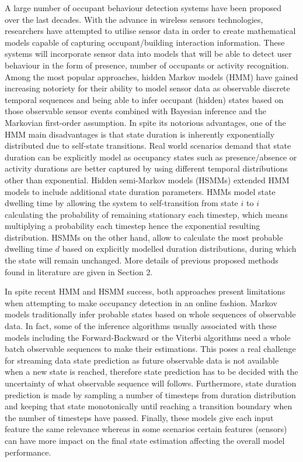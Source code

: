 \documentclass[conference]{IEEEtran}
\begin{document}
A large number of occupant behaviour detection systems have been proposed over the last decades\cite{Page2008}\cite{Pavel2006}\cite{Cook2013}. With the advance in wireless sensors technologies, researchers have attempted to utilise sensor data in order to create mathematical models capable of capturing occupant/building interaction information\cite{Teixeira2011}. These systems will incorporate sensor data into models that will be able to detect user behaviour in the form of presence, number of occupants or activity recognition. Among the most popular approaches, hidden Markov models (HMM) have gained increasing notoriety for their ability to model sensor data as observable discrete temporal sequences and being able to infer occupant (hidden) states based on those observable sensor events combined with Bayesian inference and the Markovian first-order assumption. In spite its notorious advantages, one of the HMM main disadvantages is that state duration is inherently exponentially distributed due to self-state transitions. Real world scenarios demand that state duration can be explicitly model as occupancy states such as presence/absence or activity durations are better captured by using different temporal distributions other than exponential. Hidden semi-Markov models (HSMMs) extended HMM models to include additional state duration parameters. HMMs model state dwelling time by allowing the system to self-transition from state $i$ to $i$ calculating the probability of remaining stationary each timestep, which means multiplying a probability each timestep hence the exponential resulting distribution. HSMMs on the other hand, allow to calculate the most probable dwelling time $d$ based on explicitly modelled duration distributions, during which the state will remain unchanged. More details of previous proposed methods found in literature are given in Section 2.

In spite recent HMM and HSMM success, both approaches present limitations when attempting to make occupancy detection in an online fashion. Markov models traditionally infer probable states based on whole sequences of observable data. In fact, some of the inference algorithms usually associated with these models including the Forward-Backward or the Viterbi algorithms need a whole batch observable sequences to make their estimations. This poses a real challenge for streaming data state prediction as future observable data is not available when a new state is reached, therefore state prediction has to be decided with the uncertainty of what observable sequence will follows. Furthermore, state duration prediction is made by sampling a number of timesteps from duration distribution and keeping that state monotonically until reaching a transition boundary when the number of timesteps have passed. Finally, these models give each input feature the same relevance whereas in some scenarios certain features (sensors) can have more impact on the final state estimation affecting the overall model performance. 
\end{document}
